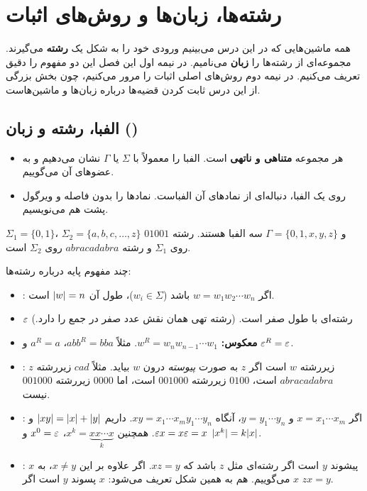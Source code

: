 \chapter{رشته‌ها، زبان‌ها و روش‌های اثبات}

همه ماشین‌هایی که در این درس می‌بینیم ورودی خود را به شکل یک \textbf{رشته} می‌گیرند. مجموعه‌ای از رشته‌ها را \textbf{زبان} می‌نامیم. در نیمه اول این فصل این دو مفهوم را دقیق تعریف می‌کنیم. در نیمه دوم روش‌های اصلی اثبات را مرور می‌کنیم، چون بخش بزرگی از این درس ثابت کردن قضیه‌ها درباره زبان‌ها و ماشین‌هاست.

\section{الفبا، رشته و زبان ()}

\begin{definition}
\begin{itemize}
\item {} هر مجموعه \textbf{متناهی و ناتهی} است. الفبا را معمولاً با $\Sigma$ یا $\Gamma$ نشان می‌دهیم و به عضوهای آن  می‌گوییم.
\item {} روی یک الفبا، دنباله‌ای  از نمادهای آن الفباست. نمادها را بدون فاصله و ویرگول پشت هم می‌نویسیم.
\end{itemize}
\end{definition}

\begin{example}
$\Sigma_1=\{0,1\}$، $\Sigma_2=\{a,b,c,\dots,z\}$ و $\Gamma=\{0,1,x,y,z\}$ سه الفبا هستند. رشته $01001$ روی $\Sigma_1$ و رشته $abracadabra$ روی $\Sigma_2$ است.
\end{example}

چند مفهوم پایه درباره رشته‌ها:
\begin{itemize}
\item {}: اگر $w=w_1w_2\cdots w_n$ باشد ($w_i\in\Sigma$)، طول آن $\lvert w\rvert=n$ است.
\item {} $\varepsilon$ رشته‌ای با طول صفر است. (رشته تهی همان نقش عدد صفر در جمع را دارد.)
\item \textbf{معکوس:} $w^R=w_nw_{n-1}\cdots w_1$. مثلاً $abb^R=bba$، $a^R=a$ و $\varepsilon^R=\varepsilon$.
\item {}: $z$ زیررشته $w$ است اگر $z$ به صورت \emph{پیوسته} درون $w$ بیاید. مثلاً $cad$ زیررشته $abracadabra$ است، $0100$ زیررشته $001000$ است، اما $0000$ زیررشته $001000$ نیست.
\item {}: اگر $x=x_1\cdots x_m$ و $y=y_1\cdots y_n$، آنگاه $xy=x_1\cdots x_my_1\cdots y_n$. داریم $\lvert xy\rvert=\lvert x\rvert+\lvert y\rvert$ و $\varepsilon x=x\varepsilon=x$. همچنین $x^k=\underbrace{xx\cdots x}_{k}$، $x^0=\varepsilon$ و $\lvert x^k\rvert=k\lvert x\rvert$.
\item {}: $x$ پیشوند $y$ است اگر رشته‌ای مثل $z$ باشد که $xz=y$. اگر علاوه بر این $x\neq y$، به $x$  می‌گوییم.  هم به همین شکل تعریف می‌شود: $x$ پسوند $y$ است اگر $zx=y$.
\end{itemize}

